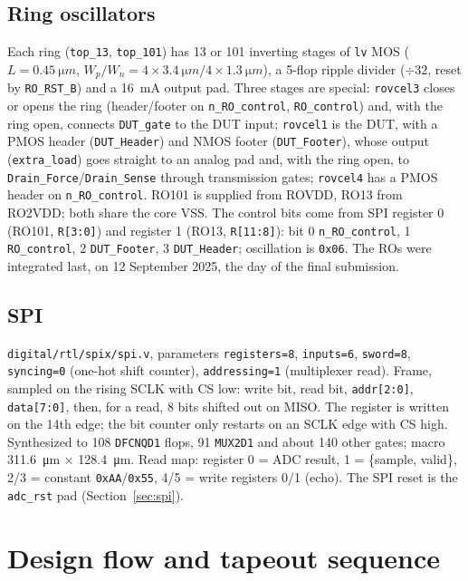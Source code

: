 \documentclass[10pt,a4paper]{article}
\begin{document}
\subsection{Ring oscillators}
Each ring (\texttt{top\_13}, \texttt{top\_101}) has 13 or 101 inverting stages of \texttt{lv} MOS
($L = \SI{0.45}{\micro m}$, $W_p/W_n = 4\times\SI{3.4}{\micro m}/4\times\SI{1.3}{\micro m}$), a 5-flop
ripple divider ($\div 32$, reset by \texttt{RO\_RST\_B}) and a \SI{16}{mA} output pad. Three stages are
special: \texttt{rovcel3} closes or opens the ring (header/footer on \texttt{n\_RO\_control},
\texttt{RO\_control}) and, with the ring open, connects \texttt{DUT\_gate} to the DUT input;
\texttt{rovcel1} is the DUT, with a PMOS header (\texttt{DUT\_Header}) and NMOS footer
(\texttt{DUT\_Footer}), whose output (\texttt{extra\_load}) goes straight to an analog pad and, with the
ring open, to \texttt{Drain\_Force}/\texttt{Drain\_Sense} through transmission gates; \texttt{rovcel4}
has a PMOS header on \texttt{n\_RO\_control}. RO101 is supplied from ROVDD, RO13 from RO2VDD; both share
the core VSS. The control bits come from SPI register 0 (RO101, \texttt{R[3:0]}) and register 1 (RO13,
\texttt{R[11:8]}): bit 0 \texttt{n\_RO\_control}, 1 \texttt{RO\_control}, 2 \texttt{DUT\_Footer},
3 \texttt{DUT\_Header}; oscillation is \texttt{0x06}. The ROs were integrated last, on
12 September 2025, the day of the final submission.

\subsection{SPI}
\nolinkurl{digital/rtl/spix/spi.v}, parameters \texttt{registers=8}, \texttt{inputs=6}, \texttt{sword=8},
\texttt{syncing=0} (one-hot shift counter), \texttt{addressing=1} (multiplexer read). Frame, sampled on
the rising SCLK with CS low: write bit, read bit, \texttt{addr[2:0]}, \texttt{data[7:0]}, then, for a
read, 8 bits shifted out on MISO. The register is written on the 14th edge; the bit counter only
restarts on an SCLK edge with CS high. Synthesized to 108 \texttt{DFCNQD1} flops, 91 \texttt{MUX2D1}
and about 140 other gates; macro \SI{311.6}{\micro m} $\times$ \SI{128.4}{\micro m}. Read map: register 0 = ADC result,
1 = \{sample, valid\}, 2/3 = constant \texttt{0xAA}/\texttt{0x55}, 4/5 = write registers 0/1 (echo).
The SPI reset is the \texttt{adc\_rst} pad (Section~\ref{sec:spi}).

\section{Design flow and tapeout sequence}
\label{sec:tapeout}
\end{document}
